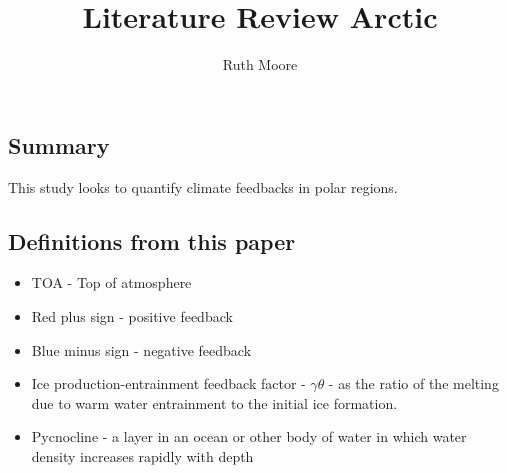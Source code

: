\documentclass{article}
\title{Literature Review Arctic }
\author{Ruth Moore}
\date{}
\begin{document}
\maketitle
\tableofcontents
\newpage

\def \sect {Goosse2018}
\section{\citeauthor{\sect} \citeyear{\sect}}
\textbf{\citefield{\sect}{title}\nocite{\sect}}
\subsection*{Summary}
This study looks to quantify climate feedbacks in polar regions.
\subsection*{Definitions from this paper}
\begin{itemize}
    \item TOA - Top of atmosphere
    \item Red plus sign - positive feedback
    \item Blue minus sign - negative feedback 
    \item Ice production-entrainment feedback factor - \( \gamma \theta \) - as the ratio of the melting due to warm water entrainment to the initial ice formation. 
    \item Pycnocline - a layer in an ocean or other body of water in which water density increases rapidly with depth
\end{itemize}
\end{document}
